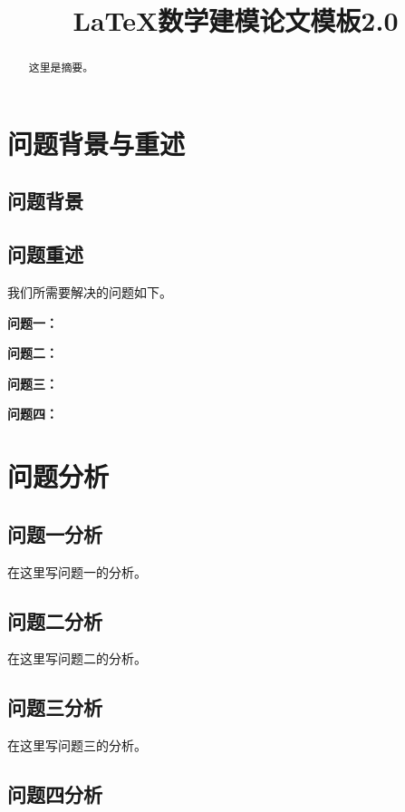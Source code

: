 \documentclass[withoutpreface,bwprint]{cumcmthesis}
\title{\LaTeX 数学建模论文模板2.0}
\begin{document}
\maketitle
 \begin{abstract}

    这里是摘要。

\end{abstract}

\section{问题背景与重述}
	
\subsection{问题背景}

\subsection{问题重述}

我们所需要解决的问题如下。

\textbf{问题一：}

\textbf{问题二：}

\textbf{问题三：}

\textbf{问题四：}

\section{问题分析}

\subsection{问题一分析}

在这里写问题一的分析。

\subsection{问题二分析}

在这里写问题二的分析。

\subsection{问题三分析}

在这里写问题三的分析。

\subsection{问题四分析}
\end{document}

